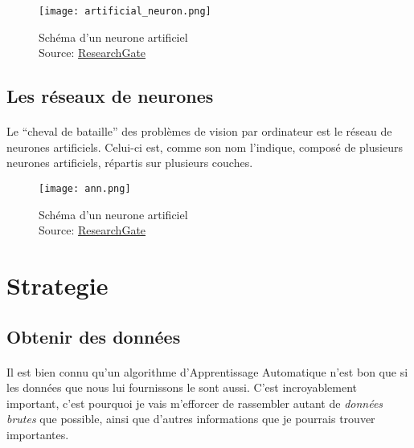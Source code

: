 \begin{figure}[H]
    \centering
    \texttt{[image: artificial\_neuron.png]}
    \caption{Schéma d'un neurone artificiel\\Source: \href{https://www.researchgate.net/figure/Scheme-of-a-perceptron-A-nonlinear-activation-function-BULLET-is-applied-to-the_fig3_315788933}{ResearchGate}}
\end{figure}


\subsection{Les réseaux de neurones}
\paragraph{}
Le ``cheval de bataille'' des problèmes de vision par ordinateur est le réseau de neurones artificiels.
Celui-ci est, comme son nom l'indique, composé de plusieurs neurones artificiels, répartis sur plusieurs couches.

\begin{figure}[H]
    \centering
    \texttt{[image: ann.png]}
    \caption{Schéma d'un neurone artificiel\\Source: \href{https://www.researchgate.net/figure/Deep-learning-diagram_fig5_323784695}{ResearchGate}}
\end{figure}

\section{Strategie}

\subsection{Obtenir des données}
\paragraph{}
Il est bien connu qu'un algorithme d'Apprentissage Automatique n'est bon que si les données que nous lui fournissons le sont aussi.
C'est incroyablement important, c'est pourquoi je vais m'efforcer de rassembler autant de \emph{données brutes} que possible, ainsi que d'autres informations que je pourrais trouver importantes.

